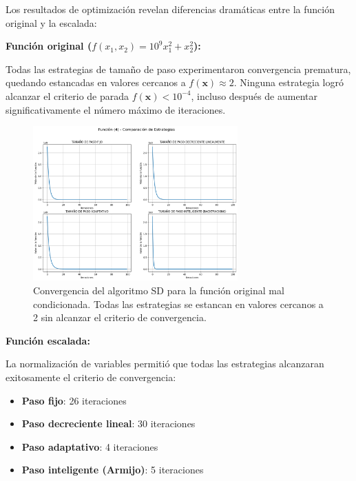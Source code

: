 \documentclass{article}
\begin{document}
Los resultados de optimización revelan diferencias dramáticas entre la función original y la escalada:

\textbf{Función original ($f(x_1, x_2) = 10^9 x_1^2 + x_2^2$):}

Todas las estrategias de tamaño de paso experimentaron convergencia prematura, quedando estancadas en valores cercanos a $f(\mathbf{x}) \approx 2$. Ninguna estrategia logró alcanzar el criterio de parada $f(\mathbf{x}) < 10^{-4}$, incluso después de aumentar significativamente el número máximo de iteraciones.

\begin{figure}[H]
\centering
\includegraphics[width=0.7\textwidth]{images/9_funcion4.png}
\caption{Convergencia del algoritmo SD para la función original mal condicionada. Todas las estrategias se estancan en valores cercanos a 2 sin alcanzar el criterio de convergencia.}
\label{fig:ill_conditioned_original}
\end{figure}

\textbf{Función escalada:}

La normalización de variables permitió que todas las estrategias alcanzaran exitosamente el criterio de convergencia:

\begin{itemize}
    \item \textbf{Paso fijo}: 26 iteraciones
    \item \textbf{Paso decreciente lineal}: 30 iteraciones  
    \item \textbf{Paso adaptativo}: 4 iteraciones
    \item \textbf{Paso inteligente (Armijo)}: 5 iteraciones
\end{itemize}
\end{document}
